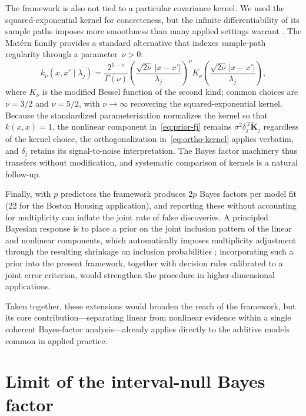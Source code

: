 \documentclass{article}
\begin{document}
The framework is also not tied to a particular covariance kernel. We
used the squared-exponential kernel for concreteness, but the infinite
differentiability of its sample paths imposes more smoothness than many
applied settings warrant \parencite{stein1999interpolation}. The Mat\'ern
family provides a standard alternative that indexes sample-path
regularity through a parameter~$\nu > 0$:
\begin{equation}
k_{\nu}(x, x' \mid \lambda_j)
  = \frac{2^{1-\nu}}{\Gamma(\nu)}
    \!\left(\frac{\sqrt{2\nu}\,|x-x'|}{\lambda_j}\right)^{\!\nu}
    K_{\nu}\!\left(\frac{\sqrt{2\nu}\,|x-x'|}{\lambda_j}\right),
\end{equation}
where $K_{\nu}$ is the modified Bessel function of the second kind;
common choices are $\nu=3/2$ and $\nu=5/2$, with $\nu\to\infty$
recovering the squared-exponential kernel. Because the standardized
parameterization normalizes the kernel so that $k(x,x)=1$, the
nonlinear component in~\eqref{eq:prior-fj} remains
$\sigma^2\delta_j^{\,2}\widetilde{\mathbf{K}}_j$ regardless of the
kernel choice, the orthogonalization in~\eqref{eq:ortho-kernel} applies
verbatim, and $\delta_j$ retains its signal-to-noise interpretation.
The Bayes factor machinery thus transfers without modification, and
systematic comparison of kernels is a natural follow-up.

Finally, with $p$ predictors the framework produces $2p$ Bayes factors
per model fit (22 for the Boston Housing application), and reporting
these without accounting for multiplicity can inflate the joint rate of
false discoveries. A principled Bayesian response is to place a prior on
the joint inclusion pattern of the linear and nonlinear components,
which automatically imposes multiplicity adjustment through the
resulting shrinkage on inclusion probabilities
\parencite{scott2010}; incorporating such a prior into the present
framework, together with decision rules calibrated to a joint error
criterion, would strengthen the procedure in higher-dimensional
applications.

Taken together, these extensions would broaden the reach of the
framework, but its core contribution---separating linear from nonlinear
evidence within a single coherent Bayes-factor analysis---already
applies directly to the additive models common in applied practice.

\appendix

\section{Limit of the interval-null Bayes factor}
\label{app:interval-limit}
 
\end{document}
